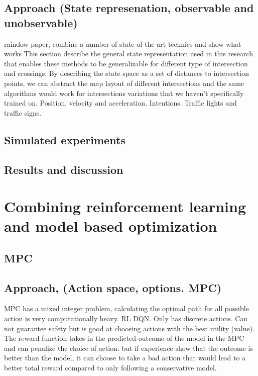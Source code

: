 \section{Approach (State represenation, observable and unobservable)}
raindow paper, combine a number of state of the art technics and show what works 
This section describe the general state representation used in this research that enables these methods to be generalizable for different type of intersection and crossings. 
By describing the state space as a set of distances to intersection points, we can abstract the map layout of different intersections and the same algorithms would work for intersections variations that we haven't specifically trained on. 
Position, velocity and acceleration. 
Intentions. Traffic lights and traffic signs. 
\section{Simulated experiments}
\section{Results and discussion}

\chapter{Combining reinforcement learning and model based optimization}
\section{MPC}

\section{Approach, (Action space, options. MPC)}
MPC has a mixed integer problem, calculating the optimal path for all possible action is very computationally heavy. 
RL DQN. Only has discrete actions. Can not guarantee safety but is good at choosing actions with the best utility (value). 
The reward function takes in the predicted outcome of the model in the MPC and can penalize the choice of action. but if experience show that the outcome is better than the model, it can choose to take a bad action that would lead to a better total reward compared to only following a conservative model. 


